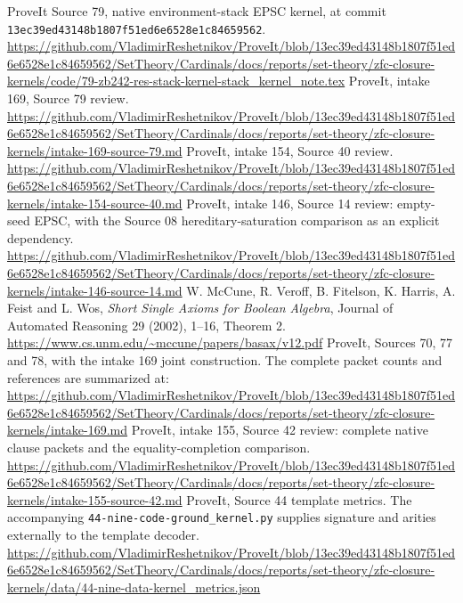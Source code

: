 
 ProveIt Source 79, native environment-stack EPSC kernel,
at commit \texttt{13ec39ed43148b1807f51ed6e6528e1c84659562}.
\url{https://github.com/VladimirReshetnikov/ProveIt/blob/13ec39ed43148b1807f51ed6e6528e1c84659562/SetTheory/Cardinals/docs/reports/set-theory/zfc-closure-kernels/code/79-zb242-res-stack-kernel-stack_kernel_note.tex}
 ProveIt, intake 169, Source 79 review.
\url{https://github.com/VladimirReshetnikov/ProveIt/blob/13ec39ed43148b1807f51ed6e6528e1c84659562/SetTheory/Cardinals/docs/reports/set-theory/zfc-closure-kernels/intake-169-source-79.md}
 ProveIt, intake 154, Source 40 review.
\url{https://github.com/VladimirReshetnikov/ProveIt/blob/13ec39ed43148b1807f51ed6e6528e1c84659562/SetTheory/Cardinals/docs/reports/set-theory/zfc-closure-kernels/intake-154-source-40.md}
 ProveIt, intake 146, Source 14 review: empty-seed EPSC,
with the Source 08 hereditary-saturation comparison as an explicit dependency.
\url{https://github.com/VladimirReshetnikov/ProveIt/blob/13ec39ed43148b1807f51ed6e6528e1c84659562/SetTheory/Cardinals/docs/reports/set-theory/zfc-closure-kernels/intake-146-source-14.md}
 W. McCune, R. Veroff, B. Fitelson, K. Harris, A. Feist and L. Wos,
\emph{Short Single Axioms for Boolean Algebra}, Journal of Automated Reasoning
29 (2002), 1--16, Theorem 2.
\url{https://www.cs.unm.edu/~mccune/papers/basax/v12.pdf}
 ProveIt, Sources 70, 77 and 78, with the intake 169 joint
construction. The complete packet counts and references are summarized at:
\url{https://github.com/VladimirReshetnikov/ProveIt/blob/13ec39ed43148b1807f51ed6e6528e1c84659562/SetTheory/Cardinals/docs/reports/set-theory/zfc-closure-kernels/intake-169.md}
 ProveIt, intake 155, Source 42 review: complete native
clause packets and the equality-completion comparison.
\url{https://github.com/VladimirReshetnikov/ProveIt/blob/13ec39ed43148b1807f51ed6e6528e1c84659562/SetTheory/Cardinals/docs/reports/set-theory/zfc-closure-kernels/intake-155-source-42.md}
 ProveIt, Source 44 template metrics. The accompanying
\texttt{44-nine-code-ground\_kernel.py} supplies signature and arities
externally to the template decoder.
\url{https://github.com/VladimirReshetnikov/ProveIt/blob/13ec39ed43148b1807f51ed6e6528e1c84659562/SetTheory/Cardinals/docs/reports/set-theory/zfc-closure-kernels/data/44-nine-data-kernel_metrics.json}
